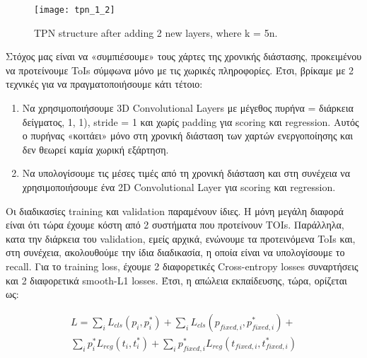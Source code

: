 \en
\begin{figure}[h]
  \centering
  \texttt{[image: tpn\_1\_2]}
  \caption{\en TPN structure after adding 2 new layers, where k = 5n.}
  \label{fig:gr_tpn_1_2}
\end{figure}
\gr

Στόχος μας είναι να «συμπιέσουμε» τους χάρτες της χρονικής διάστασης, προκειμένου να προτείνουμε \en ToIs \gr σύμφωνα μόνο με τις χωρικές πληροφορίες.
Έτσι, βρίκαμε με 2 τεχνικές για να πραγματοποιήσουμε κάτι τέτοιο:
\begin{enumerate}
\item Να χρησιμοποιήσουμε \en  3D Convolutional Layers \gr με μέγεθος πυρήνα = διάρκεια δείγματος, 1, 1), \en stride \gr = 1 και χωρίς \en padding \gr για \en scoring \gr και \en regression\gr.
  Αυτός ο πυρήνας «κοιτάει» μόνο στη χρονική διάσταση των χαρτών ενεργοποίησης και δεν θεωρεί καμία χωρική εξάρτηση.
\item Nα υπολογίσουμε τις μέσες τιμές από τη χρονική διάσταση και στη συνέχεια να χρησιμοποιήσουμε ένα \en 2D Convolutional Layer \gr για \en scoring \gr και \en regression\gr.
\end{enumerate}

\par
Οι διαδικασίες \en training \gr και \en validation \gr παραμένουν ίδιες. Η μόνη μεγάλη διαφορά είναι ότι τώρα έχουμε κόστη  από 2  συστήματα που προτείνουν \en TOIs\gr.
Παράλληλα, κατα την διάρκεια του \en validation\gr, εμείς αρχικά, ενώνουμε τα προτεινόμενα \en ToIs \gr και, στη συνέχεια, ακολουθούμε την ίδια διαδικασία, η οποία είναι να
υπολογίσουμε το \en recall\gr. Για το \en training loss\gr, έχουμε 2 διαφορετικές \en Cross-entropy losses \gr συναρτήσεις και 2 διαφορετικά \en smooth-L1 losses\gr. Έτσι,
η απώλεια εκπαίδευσης, τώρα, ορίζεται ως:




\en
\begin{equation} 
\begin{split}
 L  =  \sum_iL_{cls}(p_i, p_i^*) + \sum_iL_{cls}(p_{fixed,i}, p_{fixed,i}^*) + \\
   \sum_ip_i^*L_{reg}(t_i,t_i^*) + \sum_ip_{fixed,i}^*L_{reg}(t_{fixed,i},t_{fixed,i}^*) 
\end{split}
\end{equation}
\gr

